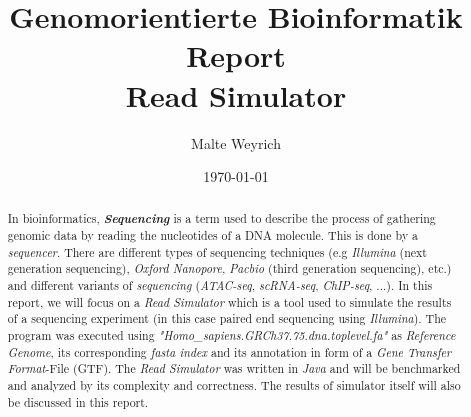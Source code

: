 \documentclass[12pt]{article}
\title{Genomorientierte Bioinformatik \\ Report \\ Read Simulator}
\author{Malte Weyrich}
\date{\today}
\begin{document}
\maketitle
\begin{abstract}
	In bioinformatics, \textit{\textbf{Sequencing}} is a term used to describe the process of gathering
	genomic data by reading the nucleotides of a DNA molecule. This is done by a \textit{sequencer}.
	There are different types of sequencing techniques (e.g \textit{Illumina} (next generation sequencing), \textit{Oxford Nanopore},
	\textit{Pacbio} (third generation sequencing), etc.)
	and different variants of \textit{sequencing} (\textit{ATAC-seq}, \textit{scRNA-seq}, \textit{ChIP-seq}, ...).
	In this report, we will focus on a \textit{Read Simulator} which is a tool used to
	simulate the results of a sequencing experiment (in this case paired end sequencing using \textit{Illumina}).
	The program was executed using \textit{"Homo\_sapiens.GRCh37.75.dna.toplevel.fa"} as \textit{Reference Genome},
	its corresponding \textit{fasta index} and its annotation in form of a \textit{Gene Transfer Format}-File (GTF).
	The \textit{Read Simulator} was written in \textit{Java} and will be benchmarked and analyzed by its complexity and correctness.
	The results of simulator itself will also be discussed in this report.

\end{abstract}

\newpage



\end{document}
